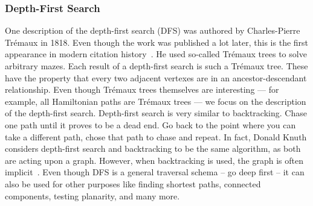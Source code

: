             \subsubsection*{Depth-First Search}
                One description of the depth-first search (DFS) was authored by Charles-Pierre Trémaux in 1818.
                Even though the work was published a lot later, this is the first appearance in modern citation history~\autocite{lucas1891recreations}. 
                He used so-called Trémaux trees to solve arbitrary mazes. 
                Each result of a depth-first search is such a Trémaux tree.
                These have the property that every two adjacent vertexes are in an ancestor-descendant relationship.
                Even though Trémaux trees themselves are interesting --- for example, all Hamiltonian paths are Trémaux trees --- we focus on the description of the depth-first search.        
                Depth-first search is very similar to backtracking. Chase one path until it proves to be a dead end. 
                Go back to the point where you can take a different path, chose that path to chase and repeat. 
                In fact, Donald Knuth considers depth-first search and backtracking to be the same algorithm, as both are acting upon a graph. 
                However, when backtracking is used, the graph is often implicit~\autocite{Knuth2000DancingL}.        
                Even though DFS is a general traversal schema -- go deep first -- it can also be used for other purposes like finding shortest paths, connected components, testing planarity, and many more. 
                        
